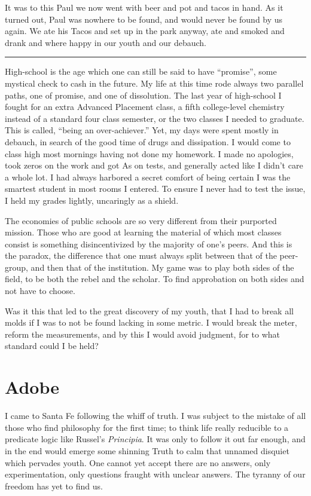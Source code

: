 \documentclass[ebook, 10pt, openright, onecolumn]{memoir}
\newcommand*\starbreak{\fancybreak*{* * *\\}}
\begin{document}
It was to this Paul we now went with beer and pot and tacos in hand.  As it
turned out, Paul was nowhere to be found, and would never be found by us again.
We ate his Tacos and set up in the park anyway, ate and smoked and drank and
where happy in our youth and our debauch.

\starbreak

High-school is the age which one can still be said to have ``promise'', some
mystical check to cash in the future.  My life at this time rode always two
parallel paths, one of promise, and one of dissolution.  The last year of
high-school I fought for an extra Advanced Placement class, a fifth
college-level chemistry instead of a standard four class semester, or the two
classes I needed to graduate. This is called, ``being an over-achiever.''  Yet,
my days were spent mostly in debauch, in search of the good time of drugs
and dissipation.  I would come to class high most mornings having not done my
homework.  I made no apologies, took zeros on the work and got As on tests, and
generally acted like I didn't care a whole lot.  I had always harbored a secret
comfort of being certain I was the smartest student in most rooms I entered.
To ensure I never had to  test the issue, I held my grades lightly, uncaringly
as a shield.  

The economies of public schools are so very different from their purported
mission.  Those who are good at learning the material of which most classes
consist is something disincentivized by the majority of one's peers.  And this
is the paradox, the difference that one must always split between that of the
peer-group, and then that of the institution.  My game was to play both sides of
the field, to be both the rebel and the scholar.  To find approbation on both
sides and not have to choose.

Was it this that led to the great discovery of my youth, that I had to break all
molds if I was to not be found lacking in some metric.  I would break the
meter, reform the measurements, and by this I would avoid judgment, for to what
standard could I be held?  

\chapter{Adobe}
\label{cha:adobe}

I came to Santa Fe following the whiff of truth.  I was subject to the mistake
of all those who find philosophy for the first time; to think life really
reducible to a predicate logic like Russel's \textit{Principia}. It was only to
follow it out far enough, and in the end would emerge some shinning Truth to
calm that unnamed disquiet which pervades youth.  One cannot yet accept there
are no answers, only experimentation, only questions fraught with unclear
answers.  The tyranny of our freedom has yet to find us.
\end{document}
